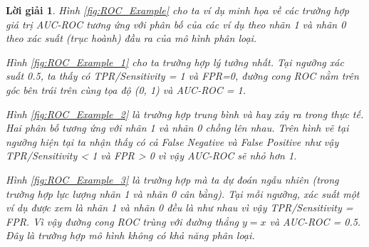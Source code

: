 \documentclass[14pt, a4paper]{article}
\theoremstyle{sltheorem}
\theoremstyle{soltheorem}
\newtheorem*{loigiai}{Lời giải}
\begin{document}
\begin{loigiai}
        Hình \ref{fig:ROC_Example} cho ta ví dụ minh họa về các trường hợp giá trị AUC-ROC tương ứng với phân bố của các ví dụ theo nhãn 1 và nhãn 0 theo xác suất (trục hoành) đầu ra của mô hình phân loại.
        
        Hình \ref{fig:ROC_Example_1} cho ta trường hợp lý tưởng nhất.
        Tại ngưỡng xác suất 0.5, ta thấy có TPR/Sensitivity = 1 và FPR=0, đường cong ROC nằm trên góc bên trái trên cùng tọa độ (0, 1) và AUC-ROC = 1.
        
        Hình \ref{fig:ROC_Example_2} là trường hợp trung bình và hay xảy ra trong thực tế.
        Hai phân bố tương ứng với nhãn 1 và nhãn 0 chồng lên nhau.
        Trên hình vẽ tại ngưỡng hiện tại ta nhận thấy có cả False Negative và False Positive như vậy TPR/Sensitivity < 1 và FPR > 0 vì vậy AUC-ROC sẽ nhỏ hơn 1.

        Hình \ref{fig:ROC_Example_3} là trường hợp mà ta dự đoán ngẫu nhiên (trong trường hợp lực lượng nhãn 1 và nhãn 0 cân bằng).
        Tại mỗi ngưỡng, xác suất một ví dụ được xem là nhãn 1 và nhãn 0 đều là như nhau vì vậy TPR/Sensitivity = FPR.
        Vì vậy đường cong ROC trùng với đường thẳng $y=x$ và AUC-ROC = 0.5.
        Đây là trường hợp mô hình không có khả năng phân loại. 


\end{loigiai}
\end{document}
